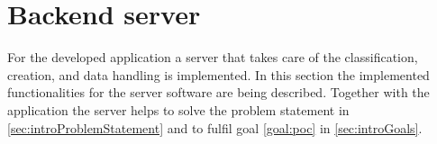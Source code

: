 \section{Backend server}\label{sec:implServer}
For the developed application a server that takes care of the classification, creation, and data handling is implemented.
In this section the implemented functionalities for the server software are being described.
Together with the application the server helps to solve the problem statement in \cref{sec:introProblemStatement} and to fulfil goal \ref{goal:poc} in \cref{sec:introGoals}.





